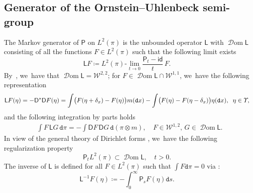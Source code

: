 \documentclass[JEP,XML,SOM,Unicode,published]{cedram}
\theoremstyle{definition}
\theoremstyle{remark}
\DeclarePairedDelimiter{\paren}{\lparen}{\rparen}
\DeclareMathOperator{\dom}{\mathscr{D}om}
\begin{document}
\subsection{Generator of the Ornstein--Uhlenbeck semi-group}

The Markov generator of $\mathsf{P}$ on $L^{2}(\pi)$ is the unbounded operator $\mathsf{L}$ with $\dom \mathsf{L}$ consisting of all the functions $F \in L^{2}(\pi)$ such that the following limit exists
\begin{equation*}
\mathsf{L} F \coloneq L^{2}(\pi)\text{-}\lim_{t \to 0} \frac{\mathsf{P}_{t} - \mathsf{id}}{t}\, F.
\end{equation*}
By~\cite[Props.\,3 \& 4 and Th.\,5]{LastAnaSto}, we~have that $\dom \mathsf{L} = \mathscr{W}^{2,2}$; for $F \in \dom{\mathsf{L}} \cap \mathscr{W}^{1,1}$, we~have the following representation
\begin{equation*}
\mathsf{L} F(\eta) = - \mathsf{D}^{\star} \mathsf{D} F(\eta) = \int \paren[\big]{F(\eta + \delta_{x}) - F(\eta)} m(\mathtt{d} x) - \int \paren[\big]{F(\eta) - F(\eta - \delta_{x})} \eta(\mathtt{d} x), \;\; \eta \in \varUpsilon,
\end{equation*}
and the following integration by parts holds
\begin{align}
& \label{e:ou-ipp-generator} \int F\, \mathsf{L} G\, \mathtt{d} \pi = - \int \mathsf{D} F\, \mathsf{D} G\, \mathtt{d}(\pi \otimes m), \quad F \in \mathscr{W}^{1,2},\, G \in \dom \mathsf{L}.
\end{align}
In view of the general theory of Dirichlet forms \cite[Th.\,2.20]{MaRockner}, we~have the following regularization property
\begin{equation}\label{e:ou-regularization-L2}
\mathsf{P}_{t} L^{2}(\pi) \subset \dom \mathsf{L}, \quad t > 0.
\end{equation}
The inverse of $\mathsf{L}$ is defined for all $F \in L^{2}(\pi)$ such that $\int F \mathtt{d} \pi = 0$ via \cite[Th.\,7]{LastAnaSto}:
\begin{equation*}
\mathsf{L}^{-1} F(\eta) \coloneq - \int_{0}^{\infty} \mathsf{P}_{s} F(\eta) \mathtt{d} s.
\end{equation*}
\end{document}
